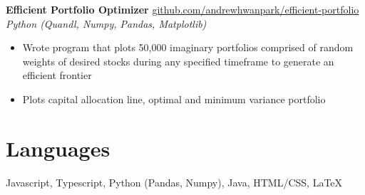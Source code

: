 \documentclass[margin]{res}
\begin{document}
\begin{resume}
	{\bf Efficient Portfolio Optimizer} \hfill \href{https://github.com/andrewhwanpark/efficient-portfolio}{github.com/andrewhwanpark/efficient-portfolio}\\
	{\it Python (Quandl, Numpy, Pandas, Matplotlib)}
	\begin{itemize} \itemsep -2pt
		\item Wrote program that plots 50,000 imaginary portfolios comprised of random weights of desired stocks during any specified timeframe to generate an efficient frontier
		\item Plots capital allocation line, optimal and minimum variance portfolio
	\end{itemize}
	
	
	\section{Languages} 
	Javascript, Typescript, Python (Pandas, Numpy), Java, HTML/CSS, LaTeX
	
	
	
\end{resume} 
\end{document}
